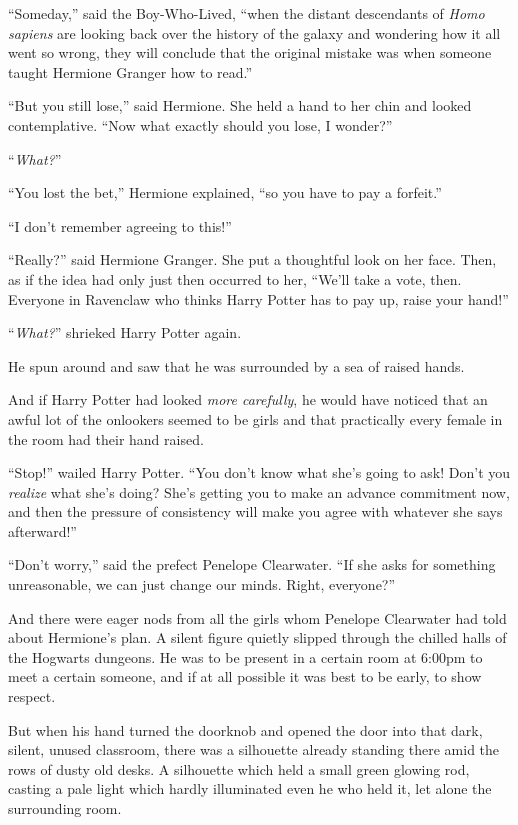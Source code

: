 “Someday,” said the Boy-Who-Lived, “when the distant descendants of \emph{Homo
sapiens} are looking back over the history of the galaxy and wondering how it
all went so wrong, they will conclude that the original mistake was when
someone taught Hermione Granger how to read.”

“But you still lose,” said Hermione. She held a hand to her chin and looked
contemplative. “Now what exactly should you lose, I wonder?”

“\emph{What?}”

“You lost the bet,” Hermione explained, “so you have to pay a forfeit.”

“I don’t remember agreeing to this!”

“Really?” said Hermione Granger. She put a thoughtful look on her face. Then,
as if the idea had only just then occurred to her, “We’ll take a vote, then.
Everyone in Ravenclaw who thinks Harry Potter has to pay up, raise your hand!”

“\emph{What?}” shrieked Harry Potter again.

He spun around and saw that he was surrounded by a sea of raised hands.

And if Harry Potter had looked \emph{more carefully}, he would have noticed
that an awful lot of the onlookers seemed to be girls and that practically
every female in the room had their hand raised.

“Stop!” wailed Harry Potter. “You don’t know what she’s going to ask! Don’t you
\emph{realize} what she’s doing? She’s getting you to make an advance
commitment now, and then the pressure of consistency will make you agree with
whatever she says afterward!”

“Don’t worry,” said the prefect Penelope Clearwater. “If she asks for something
unreasonable, we can just change our minds. Right, everyone?”

And there were eager nods from all the girls whom Penelope Clearwater had told
about Hermione’s plan.
\later
A silent figure quietly slipped through the chilled halls of the Hogwarts
dungeons. He was to be present in a certain room at 6:00pm to meet a certain
someone, and if at all possible it was best to be early, to show respect.

But when his hand turned the doorknob and opened the door into that dark,
silent, unused classroom, there was a silhouette already standing there amid
the rows of dusty old desks. A silhouette which held a small green glowing rod,
casting a pale light which hardly illuminated even he who held it, let alone
the surrounding room.


